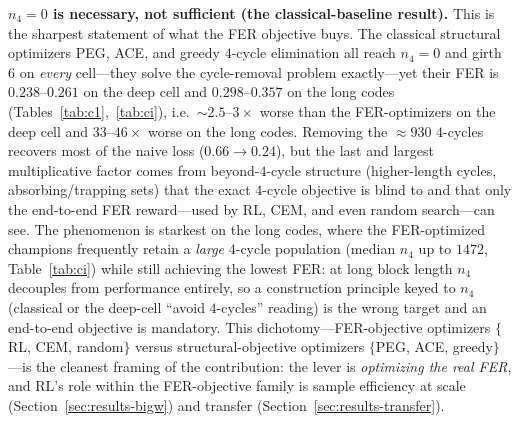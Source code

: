 \documentclass[journal]{IEEEtran}
\begin{document}
\textbf{$n_4{=}0$ is necessary, not sufficient (the classical-baseline result).}
This is the sharpest statement of what the FER objective buys. The classical
structural optimizers PEG, ACE, and greedy $4$-cycle elimination all reach
$n_4{=}0$ and girth $6$ on \emph{every} cell---they solve the cycle-removal
problem exactly---yet their FER is $0.238$--$0.261$ on the deep cell and
$0.298$--$0.357$ on the long codes (Tables~\ref{tab:c1},~\ref{tab:ci}), i.e.\
$\sim\!2.5$--$3\times$ worse than the FER-optimizers on the deep cell and
$33$--$46\times$ worse on the long codes. Removing the $\approx\!930$ $4$-cycles
recovers most of the naive loss ($0.66\!\to\!0.24$), but the last and largest
multiplicative factor comes from beyond-$4$-cycle structure (higher-length cycles,
absorbing/trapping sets) that the exact $4$-cycle objective is blind to and that
only the end-to-end FER reward---used by RL, CEM, and even random search---can
see. The phenomenon is starkest on the long codes, where the FER-optimized
champions frequently retain a \emph{large} $4$-cycle population (median $n_4$ up
to $1472$, Table~\ref{tab:ci}) while still achieving the lowest FER: at long block
length $n_4$ decouples from performance entirely, so a construction principle keyed
to $n_4$ (classical or the deep-cell ``avoid $4$-cycles'' reading) is the wrong
target and an end-to-end objective is mandatory. This dichotomy---FER-objective
optimizers $\{$RL, CEM, random$\}$ versus structural-objective optimizers
$\{$PEG, ACE, greedy$\}$---is the cleanest framing of the contribution: the lever
is \emph{optimizing the real FER}, and RL's role within the FER-objective family
is sample efficiency at scale (Section~\ref{sec:results-bigw}) and transfer
(Section~\ref{sec:results-transfer}).
\end{document}
